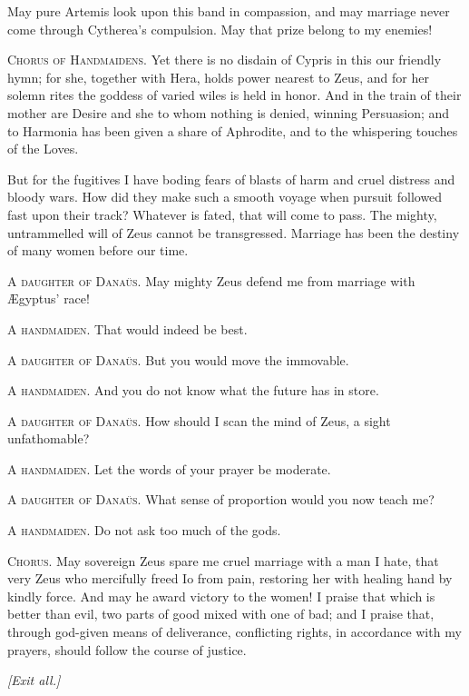 \documentclass[12pt]{article}
\begin{document}
May pure Artemis look upon this band in compassion, and may marriage never come through Cytherea's compulsion. May that prize belong to my enemies!

\textsc{Chorus of Handmaidens.} Yet there is no disdain of Cypris in this our friendly hymn; for she, together with Hera, holds power nearest to Zeus, and for her solemn rites the goddess of varied wiles is held in honor. And in the train of their mother are Desire and she to whom nothing is denied, winning Persuasion; and to Harmonia has been given a share of Aphrodite, and to the whispering touches of the Loves.

But for the fugitives I have boding fears of blasts of harm and cruel distress and bloody wars. How did they make such a smooth voyage when pursuit followed fast upon their track? Whatever is fated, that will come to pass. The mighty, untrammelled will of Zeus cannot be transgressed. Marriage has been the destiny of many women before our time.

\textsc{A daughter of Dana\"{u}s.} May mighty Zeus defend me from marriage with {\AE}gyptus' race!

\textsc{A handmaiden.} That would indeed be best.

\textsc{A daughter of Dana\"{u}s.} But you would move the immovable.

\textsc{A handmaiden.} And you do not know what the future has in store.

\textsc{A daughter of Dana\"{u}s.} How should I scan the mind of Zeus, a sight unfathomable?

\textsc{A handmaiden.} Let the words of your prayer be moderate.

\textsc{A daughter of Dana\"{u}s.} What sense of proportion would you now teach me?

\textsc{A handmaiden.} Do not ask too much of the gods.

\textsc{Chorus.} May sovereign Zeus spare me cruel marriage with a man I hate, that very Zeus who mercifully freed Io from pain, restoring her with healing hand by kindly force. And may he award victory to the women! I praise that which is better than evil, two parts of good mixed with one of bad; and I praise that, through god-given means of deliverance, conflicting rights, in accordance with my prayers, should follow the course of justice.

\begin{center}
\textit{[Exit all.]}
\end{center}
\end{document}
